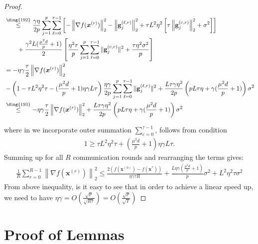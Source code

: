 \begin{proof}
\begin{align}
     &\stackrel{\text{\ding{192}}}{\leq}\frac{\gamma\eta}{2p}\sum_{j=1}^p\sum_{\ell=0}^{\tau-1}\left[-\left\|\nabla f({\boldsymbol{x}}^{(r)})\right\|_2^2-\left\|\mathbf{g}_j^{(\ell,r)}\right\|_2^2+\tau L^2\eta^2\left[\tau\left\|{\mathbf{g}}_j^{(c,r)}\right\|_2^2+\sigma^2\right]\right]\nonumber\\
     &\qquad+\frac{\gamma^2 L(\frac{\mu ^2d}{p}+1)}{2}\left[\frac{\eta^2\tau}{p}\sum_{j=1}^p\sum_{\ell=0}^{\tau-1}\|\mathbf{g}^{(c,r)}_{j}\|^2+\frac{\tau\eta^2 \sigma^2}{p}\right]\nonumber\\
     &=-\eta\gamma\frac{\tau}{2}\left\|\nabla f({\boldsymbol{x}}^{(r)})\right\|_2^2\nonumber\\
     &-\left(1-{\tau L^2\eta^2\tau}-{(\frac{\mu^2 d}{p}+1)\eta\gamma L}{\tau}\right)\frac{\eta\gamma}{2p}\sum_{j=1}^p\sum_{\ell=0}^{\tau-1}\|\mathbf{g}^{(\ell,r)}_{j}\|^2+\frac{L\tau\gamma\eta^2 }{2p}\left(pL\tau\eta+\gamma(\frac{\mu^2d}{p}+1)\right)\sigma^2\nonumber\\
     &\stackrel{\text{\ding{193}}}{\leq} -\eta\gamma\frac{\tau}{2}\left\|\nabla f({\boldsymbol{x}}^{(r)})\right\|_2^2+\frac{L\tau\gamma\eta^2 }{2p}\left(pL\tau\eta+\gamma(\frac{\mu^2d}{p}+1)\right)\sigma^2\label{eq:finalll}
\end{align}

where in  we incorporate outer summation $\sum_{c=0}^{\tau-1}$,  follows from condition 
\begin{align}
   1\geq {\tau L^2\eta^2\tau}+(\frac{\mu^2 d}{p}+1)\eta\gamma L{\tau}. 
\end{align}
Summing up for all $R$ communication rounds and  rearranging the terms gives:
\begin{align}
    \frac{1}{R}\sum_{r=0}^{R-1}\left\|\nabla f({\boldsymbol{x}}^{(r)})\right\|_2^2\leq \frac{2\left(f(\boldsymbol{x}^{(0)})-f(\boldsymbol{x}^{*})\right)}{\eta\gamma\tau R}+\frac{L\eta\gamma{(\frac{\mu^2 d}{p}+1)}}{p}\sigma^2+{L^2\eta^2\tau }\sigma^2
\end{align}
From above inequality, is it easy to see that in order to achieve a linear speed up, we need to have $\eta\gamma=O\left(\frac{\sqrt{p}}{\sqrt{R \tau}}\right)=O\left(\frac{\sqrt{p}}{\sqrt{T}}\right)$

\end{proof}
\section{Proof of Lemmas}
